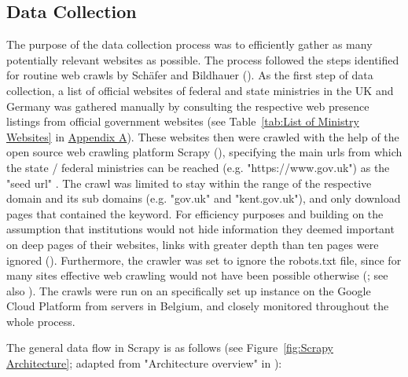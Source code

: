 \subsection{Data Collection}
The purpose of the data collection process was to efficiently gather as many potentially relevant websites as possible. The process followed the steps identified for routine web crawls by Schäfer and Bildhauer (\cite*{Schafer2012}).  As the first step of data collection, a list of official websites of federal and state ministries in the UK and Germany was gathered manually by consulting the respective web presence listings from official government websites (see Table~\ref{tab:List of Ministry Websites} in \hyperref[Appendix A]{Appendix A}). These websites then were crawled with the help of the open source web crawling platform Scrapy (\cite{Kouzis-Loukas2016}), specifying the main urls from which the state / federal ministries can be reached (e.g. "https://www.gov.uk") as the "seed url" \parencite[p. 115]{Barbaresi2015}. The crawl was limited to stay within the range of the respective domain and its sub domains (e.g. "gov.uk" and "kent.gov.uk"), and only download pages that contained the keyword. For efficiency purposes and building on the assumption that institutions would not hide information they deemed important on deep pages of their websites, links with greater depth than ten pages were ignored (\cite{Scrapy2018, Wang2019}). Furthermore, the crawler was set to ignore the robots.txt file, since for many sites effective web crawling would not have been possible otherwise (\cite{Sun2007}; see also \cite[p. 125]{Barbaresi2015}). The crawls were run on an specifically set up instance on the Google Cloud Platform from servers in Belgium, and closely monitored throughout the whole process.\par
The general data flow in Scrapy is as follows (see Figure~\ref{fig:Scrapy Architecture}; adapted from "Architecture overview" in \cite{Scrapy2018}):
